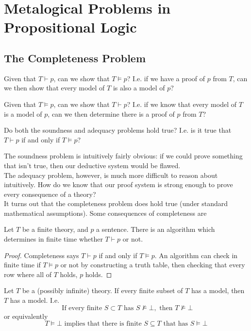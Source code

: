 \documentclass[11pt]{article}
\begin{document}
\section{Metalogical Problems in Propositional Logic}
\subsection{The Completeness Problem}
\begin{defi}
     Given that $T \vdash p$, can we show that $T \vDash p$? I.e. if we have a proof of $p$ from $T$, can we then show that every model of $T$ is also a model of $p$?
\end{defi}
\begin{defi}
      Given that $T \vDash p$, can we show that $T \vdash p$? I.e. if we know that every model of $T$ is a model of $p$, can we then determine there is a proof of $p$ from $T$?
\end{defi}
\begin{defi}
     
    Do both the soundness and adequacy problems hold true? I.e.  is it true that $T \vdash p$ if and only if $T \vDash p$?
\end{defi}
The soundness problem is intuitively fairly obvious: if we could prove something that isn't true, then our deductive system would be flawed.
\\ The adequacy problem, however, is much more difficult to reason about intuitively. How do we know that our proof system is strong enough to prove every consequence of a theory?
\\ It turns out that the completeness problem does hold true (under standard mathematical assumptions). Some consequences of completeness are
\begin{theorem}
    Let $T$ be a finite theory, and $p$ a sentence. There is an algorithm which determines in finite time whether $T \vdash p$ or not.
\end{theorem}
\begin{proof}
    Completeness says $T \vdash p$ if and only if $T \vDash p$. An algorithm can check in finite time if $T \vDash p$ or not by constructing a truth table, then checking that every row where all of $T$ holds, $p$ holds.
\end{proof}
\begin{theorem}
    Let $T$ be a (possibly infinite) theory. If every finite subset of $T$ has a model, then $T$ has a model.
    I.e. \[\text{ If every finite } S \subset T \text{ has } S \not\vDash \bot, \text{ then } T \not\vDash \bot \]
    or equivalently
    \[T \vDash \bot \text{ implies that there is finite } S \subseteq T \text{ that has } S \vDash \bot\]
\end{theorem}
\end{document}

